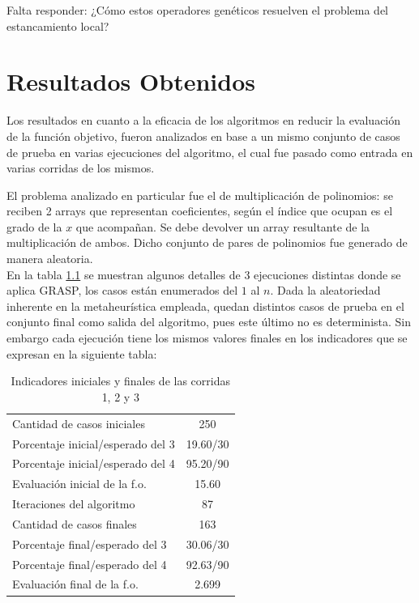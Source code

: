 \documentclass[a4paper,12pt]{book}
\begin{document}
		Falta responder: ¿Cómo estos operadores genéticos resuelven el problema del estancamiento local?
	
	
\chapter{Resultados Obtenidos}
	Los resultados en cuanto a la eficacia de los algoritmos en reducir la evaluación de la función objetivo, fueron analizados en base a un mismo conjunto de casos de prueba en varias ejecuciones del algoritmo, el cual fue pasado como entrada en varias corridas de los mismos.
	
	El problema analizado en particular fue el de multiplicación de polinomios: se reciben 2 arrays que representan coeficientes, según el índice que ocupan es el grado de la $x$ que acompañan. Se debe devolver un array resultante de la multiplicación de ambos. Dicho conjunto de pares de polinomios fue generado de manera aleatoria. \\
	
	En la tabla \ref{tab:IndicadoresGRASP123} se muestran algunos detalles de 3 ejecuciones distintas donde se aplica GRASP, los casos están enumerados del $1$ al $n$. Dada la aleatoriedad inherente en la metaheurística empleada, quedan distintos casos de prueba en el conjunto final como salida del algoritmo, pues este último no es determinista. Sin embargo cada ejecución tiene los mismos valores finales en los indicadores que se expresan en la siguiente tabla:
	
	\begin{table}[h]
		\begin{center}
			\begin{tabular}{| l | c |} \hline
				Cantidad de casos iniciales & 250 \\
				Porcentaje inicial/esperado del 3 & 19.60/30 \\
				Porcentaje inicial/esperado del 4 & 95.20/90 \\
				Evaluación inicial de la f.o. & 15.60 \\ \hline
				Iteraciones del algoritmo & 87 \\ \hline
				Cantidad de casos finales & 163 \\
				Porcentaje final/esperado del 3 & 30.06/30 \\
				Porcentaje final/esperado del 4 & 92.63/90 \\
				Evaluación final de la f.o. & 2.699 \\ \hline
			\end{tabular}
			\caption{Indicadores iniciales y finales de las corridas 1, 2 y 3}
			\label{tab:IndicadoresGRASP123}
		\end{center}
	\end{table}
\end{document}

